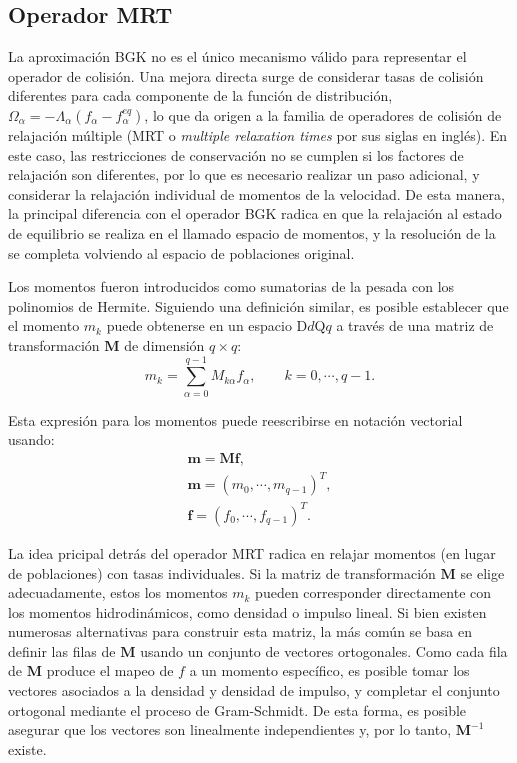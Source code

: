 \subsection{Operador MRT}

La aproximaci\'on BGK no es el \'unico mecanismo v\'alido para representar el operador de colisi\'on. Una mejora directa surge de considerar tasas de colisi\'on diferentes para cada componente de la funci\'on de distribuci\'on, $\Omega_{\alpha} = -\Lambda_{\alpha}(f_{\alpha} - f_{\alpha}^{eq})$, lo que da origen a la familia de operadores de colisi\'on de relajaci\'on m\'ultiple \cite{lallemand_theory_2000} (MRT o \emph{multiple relaxation times} por sus siglas en ingl\'es). En este caso, las restricciones de conservaci\'on no se cumplen si los factores de relajaci\'on son diferentes, por lo que es necesario realizar un paso adicional, y considerar la relajaci\'on individual de momentos de la velocidad. De esta manera, la principal diferencia con el operador BGK radica en que la relajaci\'on al estado de equilibrio se realiza en el llamado espacio de momentos, y la resoluci\'on de la \lbe{} se completa volviendo al espacio de poblaciones original.

Los momentos fueron introducidos como sumatorias de la \fdp{} pesada con los polinomios de Hermite. Siguiendo una definici\'on similar, es posible establecer que el momento $m_k$ puede obtenerse en un espacio D$d$Q$q$ a trav\'es de una matriz de transformaci\'on $\bm{M}$ de dimensi\'on $q \times q$:
\begin{equation}
	m_k = \sum_{\alpha=0}^{q-1}M_{k\alpha}f_{\alpha}, \qquad  k=0,\cdots, q-1.
\end{equation}

Esta expresi\'on para los momentos puede reescribirse en notaci\'on vectorial usando:
\begin{equation}
	\begin{gathered}
		\bm{m}=\bm{Mf}, \\
		\bm{m} = (m_0, \cdots, m_{q-1})^T, \\
		\bm{f} = (f_0, \cdots, f_{q-1})^T.
	\end{gathered}
\end{equation}

La idea pricipal detr\'as del operador MRT radica en relajar momentos (en lugar de poblaciones) con tasas individuales. Si la matriz de transformaci\'on $\bm{M}$ se elige adecuadamente, estos los momentos $m_k$ pueden corresponder directamente con los momentos hidrodin\'amicos, como densidad o impulso lineal. Si bien existen numerosas alternativas para construir esta matriz, la m\'as com\'un se basa en definir las filas de $\bm{M}$ usando un conjunto de vectores ortogonales. Como cada fila de $\bm{M}$ produce el mapeo de $f$ a un momento espec\'ifico, es posible tomar los vectores asociados a la densidad y densidad de impulso, y completar el conjunto ortogonal mediante el proceso de Gram-Schmidt. De esta forma, es posible asegurar que los vectores son linealmente independientes y, por lo tanto, $\bm{M}^{-1}$ existe.

